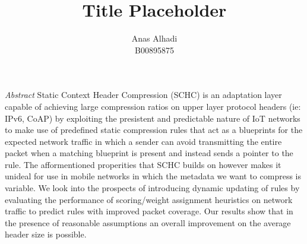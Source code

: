 \documentclass[cspaper]{IEEEtran}
\title{Title Placeholder}
\author{Anas Alhadi\\B00895875}
\numberwithin{equation}{subsection}
\begin{document}
	\maketitle
	
	\thispagestyle{fancy}


\par{
		\emph{Abstract} Static Context Header Compression (SCHC) is an adaptation layer
		capable of achieving large compression ratios on upper layer protocol headers (ie: IPv6, CoAP) by exploiting the presistent and predictable nature of 
		IoT networks to make use of predefined static compression rules that act as a blueprints for the 
		expected network traffic in which a sender can avoid transmitting the entire packet when a matching blueprint is present and instead sends a pointer to the rule. The 
		afformentioned properities that SCHC builds on however makes it unideal for use in mobile networks in which the metadata we want to compress is variable.
		We look into the prospects of introducing dynamic updating of rules by evaluating the performance of scoring/weight assignment heuristics on
		network traffic to predict rules with improved packet coverage. Our results show that in the presence of reasonable assumptions an overall 
		improvement on the average header size is possible. 
	}
\end{document}
